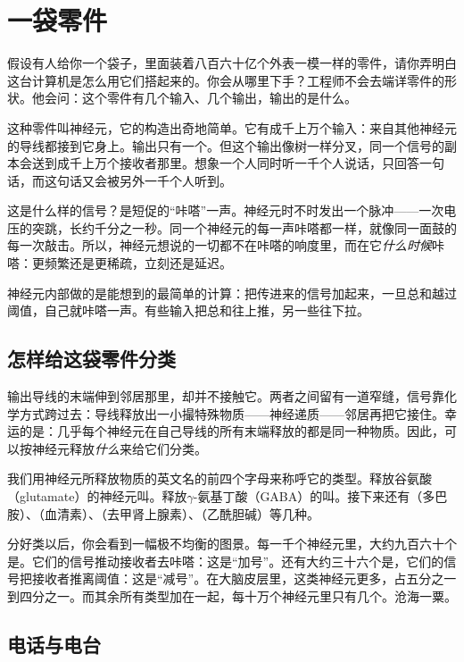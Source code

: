\chapter{一袋零件}


假设有人给你一个袋子，里面装着八百六十亿个外表一模一样的零件，请你弄明白这台计算机是怎么用它们搭起来的。你会从哪里下手？工程师不会去端详零件的形状。他会问：这个零件有几个输入、几个输出，输出的是什么。

这种零件叫神经元，它的构造出奇地简单。它有成千上万个输入：来自其他神经元的导线都接到它身上。输出只有一个。但这个输出像树一样分叉，同一个信号的副本会送到成千上万个接收者那里。想象一个人同时听一千个人说话，只回答一句话，而这句话又会被另外一千个人听到。

这是什么样的信号？是短促的“咔嗒”一声。神经元时不时发出一个脉冲——一次电压的突跳，长约千分之一秒。同一个神经元的每一声咔嗒都一样，就像同一面鼓的每一次敲击。所以，神经元想说的一切都不在咔嗒的响度里，而在它\emph{什么时候}咔嗒：更频繁还是更稀疏，立刻还是延迟。

神经元内部做的是能想到的最简单的计算：把传进来的信号加起来，一旦总和越过阈值，自己就咔嗒一声。有些输入把总和往上推，另一些往下拉。

\section*{怎样给这袋零件分类}

输出导线的末端伸到邻居那里，却并不接触它。两者之间留有一道窄缝，信号靠化学方式跨过去：导线释放出一小撮特殊物质——神经递质——邻居再把它接住。幸运的是：几乎每个神经元在自己导线的所有末端释放的都是同一种物质。因此，可以按神经元释放\emph{什么}来给它们分类。

我们用神经元所释放物质的英文名的前四个字母来称呼它的类型。释放谷氨酸（glutamate）的神经元叫。释放$\gamma$-氨基丁酸（GABA）的叫。接下来还有（多巴胺）、（血清素）、（去甲肾上腺素）、（乙酰胆碱）等几种。

分好类以后，你会看到一幅极不均衡的图景。每一千个神经元里，大约九百六十个是。它们的信号推动接收者去咔嗒：这是“加号”。还有大约三十六个是，它们的信号把接收者推离阈值：这是“减号”。在大脑皮层里，这类神经元更多，占五分之一到四分之一。而其余所有类型加在一起，每十万个神经元里只有几个。沧海一粟。

\section*{电话与电台}

